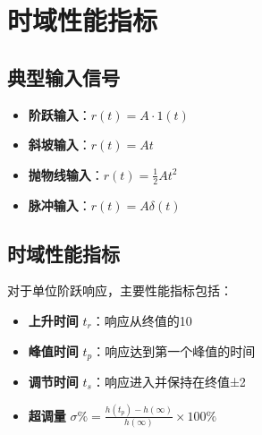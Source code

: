 \section{时域性能指标}

\subsection{典型输入信号}
\begin{itemize}
    \item \textbf{阶跃输入}：$r(t) = A \cdot 1(t)$
    \item \textbf{斜坡输入}：$r(t) = At$
    \item \textbf{抛物线输入}：$r(t) = \frac{1}{2}At^2$
    \item \textbf{脉冲输入}：$r(t) = A\delta(t)$
\end{itemize}

\subsection{时域性能指标}
对于单位阶跃响应，主要性能指标包括：
\begin{itemize}
    \item \textbf{上升时间} $t_r$：响应从终值的10%
    \item \textbf{峰值时间} $t_p$：响应达到第一个峰值的时间
    \item \textbf{调节时间} $t_s$：响应进入并保持在终值±2%
    \item \textbf{超调量} $\sigma\% = \frac{h(t_p) - h(\infty)}{h(\infty)} \times 100\%$
\end{itemize}

